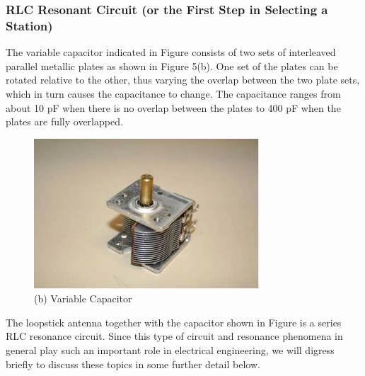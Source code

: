 \documentclass [utf8] {article}
\begin{document}
\subsubsection{RLC Resonant Circuit (or the First Step in Selecting a Station)}
{
	The variable capacitor indicated in Figure  consists of two sets of interleaved parallel metallic plates as shown in Figure 5(b). One set of the plates can be rotated relative to the other, thus varying the overlap between the two plate sets, which in turn causes the capacitance to change. The capacitance ranges from about 10 pF when there is no overlap between the plates to 400 pF when the plates are fully overlapped.

	\begin{figure}[H]
		\begin{small}
			\begin{center}
				\includegraphics[width=0.75\textwidth]{figures/Figure5.png}
			\end{center}
			\caption{(b) Variable Capacitor}
			\label{fig:antenna_2}
		\end{small}
	\end{figure}

	The loopstick antenna together with the capacitor shown in Figure is a series RLC resonance circuit. Since this type of circuit and resonance phenomena in general play such an important role in electrical engineering, we will digress briefly to discuss these topics in some further detail below.

}
\end{document}
